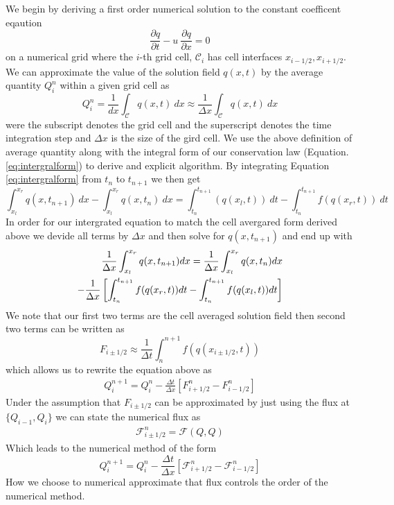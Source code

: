 \documentclass[review,onefignum,onetabnum]{siamart171218}
\begin{document}
We begin by deriving a first order numerical solution to the constant coefficent eqaution 
\begin{equation}
     \frac{\partial q}{\partial t} - u\: \frac{\partial q}{\partial x} = 0 
\end{equation}
on a numerical grid where the $i$-th grid cell, $\mathcal{C}_i$ has cell interfaces $x_{i-1/2}, x_{i+1/2}$. We can approximate the value of the solution field $q(x,t)$ by the average quantity $Q_i^n$ within a given grid cell as 
\begin{equation}
    Q_i^n  = \frac{1}{dx} \int_\mathcal{C} q(x,t)\: dx \approx \frac{1}{\Delta x} \int_\mathcal{C} q(x,t) \: dx
\end{equation}
were the subscript denotes the grid cell and the superscript denotes the time integration step and $\Delta x$ is the size of the gird cell. We use the above definition of average quantity along with the integral form of our conservation law (Equation. \cref{eq:intergralform}) to derive and explicit algorithm. By integrating Equation  \cref{eq:intergralform} from $t_n$ to $t_{n+1}$ we then get 
\begin{equation}
    \int_{x_l}^{x_r} q(x,t_{n+1}) \: dx - \int_{x_l}^{x_r} q(x,t_n) \: dx = \int_{t_n}^{t_{n+1}} (q(x_l,t)) \: dt  - \int_{t_n}^{t_{n+1}} f(q(x_r ,t)) \: dt
\end{equation}
In order for our intergrated equation to match the cell avergared form derived above we devide all terms by $\Delta x$ and then solve for $q(x,t_{n+1})$ and end up with 
\begin{align}
    \frac{1}{\Delta x} \int_{x_l}^{x_r} q(x,t_{n+1}) dx  = \frac{1}{\Delta x} \int_{x_l}^{x_r} q(x,t_n) dx \\
    - \frac{1}{\Delta x} \left[ \int_{t_n}^{t_{n+1}} f(q(x_r ,t)) dt - \int_{t_n}^{t_{n+1}} f(q(x_l,t)) dt \right] \notag
\end{align}
We note that our first two terms are the cell averaged solution field then second two terms can be written as 
\begin{equation}
    F_{i \pm 1/2} \approx \frac{1}{\Delta t} \int_n^{n+1} f(q(x_{i\pm 1/2}, t))
\end{equation}
which allows us to rewrite the equation above as 
\begin{align}
    Q_i^{n+1}  = Q_i^{n} - \frac{\Delta t}{\Delta x} \left[ F^n_{i + 1/2} - F^n_{i - 1/2} \right]
\end{align}
Under the assumption that $F_{i \pm 1/2}$ can be approximated by just using the flux at $\{Q_{i-1}, Q_i\}$ we can state the numerical flux as
\begin{align}
    \mathcal{F}_{i\pm 1/2}^n = \mathcal{F} \left( Q, Q\right)
\end{align}
Which leads to the numerical method of the form 
\begin{equation}
     Q_i^{n+1}  = Q_i^{n} - \frac{\Delta t}{\Delta x} \left[ \mathcal{F}^n_{i + 1/2} - \mathcal{F}^n_{i - 1/2} \right]
\end{equation}
How we choose to numerical approximate that flux controls the order of the numerical method. 
\end{document}

